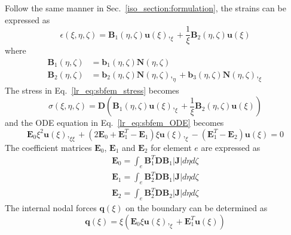 %
Follow the same manner in Sec.~\ref{iso_section:formulation}, the strains can be expressed as
\begin{equation}
    \epsilon(\xi, \eta, \zeta) =
    \mathbf{B}_1 (\eta, \zeta) \mathbf{u} (\xi),_\xi +
    \frac{1}{\xi} \mathbf{B}_2 (\eta, \zeta) \mathbf{u} (\xi)
\end{equation}
%
where
\begin{subequations}
\begin{align}
    \mathbf{B}_1 (\eta, \zeta) & =
    \mathbf{b}_1 (\eta, \zeta) \mathbf{N} (\eta, \zeta) \\
    \mathbf{B}_2 (\eta, \zeta) & =
    \mathbf{b}_2 (\eta, \zeta) \mathbf{N} (\eta, \zeta),_\eta +
    \mathbf{b}_3 (\eta, \zeta) \mathbf{N} (\eta, \zeta),_\xi
\end{align}
\end{subequations}
%
The stress in Eq.~\ref{lr_eq:sbfem_stress} becomes
\begin{equation}
    \sigma(\xi, \eta, \zeta) = \mathbf{D} \left(
        \mathbf{B}_1 (\eta, \zeta) \mathbf{u} (\xi),_\xi +
        \frac{1}{\xi} \mathbf{B}_2 (\eta, \zeta) \mathbf{u} (\xi)
    \right)
\end{equation}
%
and the ODE equation in Eq.~\ref{lr_eq:sbfem_ODE} becomes
\begin{equation}
    \mathbf{E}_0 \xi^2 \mathbf{u}(\xi),_{\xi\xi} +
    (2\mathbf{E}_0 + \mathbf{E}_1^T - \mathbf{E}_1)\xi \mathbf{u}(\xi),_{\xi} -
    (\mathbf{E}_1^T - \mathbf{E}_2) \mathbf{u}(\xi)
    = 0
\label{oct_eq:sbfem_ode}
\end{equation}
%
The coefficient matrices $\mathbf{E}_0$, $\mathbf{E}_1$ and $\mathbf{E}_2$ for element $e$ are expressed as
\begin{subequations}
\begin{align}
    \mathbf{E}_0 = \int_e \mathbf{B}_1^T \mathbf{D} \mathbf{B}_1 |\mathbf{J}| d\eta d\zeta \\
    \mathbf{E}_1 = \int_e \mathbf{B}_2^T \mathbf{D} \mathbf{B}_1 |\mathbf{J}| d\eta d\zeta \\
    \mathbf{E}_2 = \int_e \mathbf{B}_2^T \mathbf{D} \mathbf{B}_2 |\mathbf{J}| d\eta d\zeta 
\end{align}
\end{subequations}
%
The internal nodal forces $\mathbf{q}(\xi)$ on the boundary can be determined as \cite{Son2004a}
\begin{equation}
    \mathbf{q} (\xi) = \xi (
        \mathbf{E}_0 \xi \mathbf{u}(\xi),_\xi +
        \mathbf{E}_1^T \mathbf{u}(\xi)
    )
\label{oct_eq:sbfem_nodal_forces}
\end{equation}
